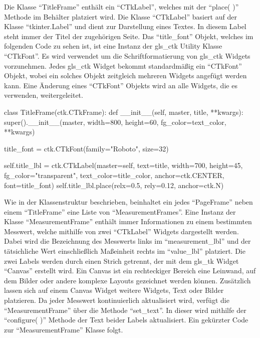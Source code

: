 Die Klasse \enquote{TitleFrame} enthält ein \enquote{CTkLabel}, welches mit der \enquote{place( )} Methode im Behälter platziert wird. Die Klasse \enquote{CTkLabel} basiert auf der Klasse \enquote{tkinter.Label} und dient zur Darstellung eines Textes. In diesem Label steht immer der Titel der zugehörigen Seite. Das \enquote{title\_font} Objekt, welches im folgenden Code zu sehen ist, ist eine Instanz der \gls{gls_ctk} Utility Klasse \enquote{CTkFont}. Es wird verwendet um die Schriftformatierung von \gls{gls_ctk} Widgets vorzunehmen. Jedes \gls{gls_ctk} Widget bekommt standardmäßig ein \enquote{CTkFont} Objekt, wobei ein solches Objekt zeitgleich mehreren Widgets angefügt werden kann. Eine Änderung eines \enquote{CTkFont} Objekts wird an alle Widgets, die es verwenden, weitergeleitet. \cite[vgl.][]{Schimansky:o.J.}

\begin{pythoncode}
class TitleFrame(ctk.CTkFrame):
	def __init__(self, master, title, **kwargs):
		super().__init__(master, width=800, height=60, fg_color=text_color, **kwargs)
		
		title_font = ctk.CTkFont(family="Roboto", size=32)
		
		self.title_lbl = ctk.CTkLabel(master=self, text=title, width=700, height=45, fg_color="transparent", text_color=title_color, anchor=ctk.CENTER, font=title_font)
		self.title_lbl.place(relx=0.5, rely=0.12, anchor=ctk.N)
\end{pythoncode}

Wie in der Klassenstruktur beschrieben, beinhaltet ein jedes \enquote{PageFrame} neben einem \enquote{TitleFrame} eine Liste von \enquote{MeasurementFrames}. Eine Instanz der Klasse \enquote{MeasurementFrame} enthält immer Informationen zu einem bestimmten Messwert, welche mithilfe von zwei \enquote{CTkLabel} Widgets dargestellt werden. Dabei wird die Bezeichnung des Messwerts links im \enquote{measurement\_lbl} und der tätsichliche Wert einschließlich Maßeinheit rechts im \enquote{value\_lbl} platziert. Die zwei Labels werden durch einen Strich getrennt, der mit dem \gls{gls_tk} Widget \enquote{Canvas} erstellt wird. Ein Canvas ist ein rechteckiger Bereich \bzw eine Leinwand, auf dem Bilder oder andere komplexe Layouts gezeichnet werden können. Zusätzlich lassen sich auf einem Canvas Widget \zB weitere Widgets, Text oder Bilder platzieren. \cite[vgl.][20]{Shipman:2013} 
\newline Da jeder Messwert kontinuierlich aktualisiert wird, verfügt die \enquote{MeasurementFrame} über die Methode \enquote{set\_text}. In dieser wird mithilfe der \enquote{configure( )} Methode der Text beider Labels aktualisiert. Ein gekürzter Code zur \enquote{MeasurementFrame} Klasse folgt.

